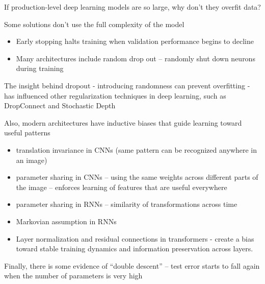 \begin{frame}
    
    If production-level deep learning models are so large, why don't they
    overfit data?

    Some solutions don't use the full complexity of the model

    \begin{itemize}
        \item Early stopping halts training when validation performance begins to decline
        \item Many architectures include random drop out -- randomly shut down neurons
            during training
    \end{itemize}


    The insight behind dropout - introducing randomness can prevent overfitting -
    has influenced other regularization techniques in deep learning, such
    as DropConnect and Stochastic Depth

\end{frame}

\begin{frame}
    
    Also, modern architectures have inductive biases that guide learning toward useful patterns

    \begin{itemize}
        \item translation invariance in CNNs (same pattern can be
            recognized anywhere in an image)
        \item parameter sharing in CNNs -- using the same weights across different parts
            of the image -- enforces learning of features that are useful everywhere
        \item parameter sharing in RNNs -- similarity of transformations across
            time
        \item Markovian assumption in RNNs 
        \item Layer normalization and residual connections in transformers -
            create a bias toward stable training dynamics and information preservation across layers.
    \end{itemize}
    
\end{frame}


\begin{frame}
    
    Finally, there is some evidence of ``double descent'' -- test error starts to fall again
    when the number of parameters is very high

\end{frame}


